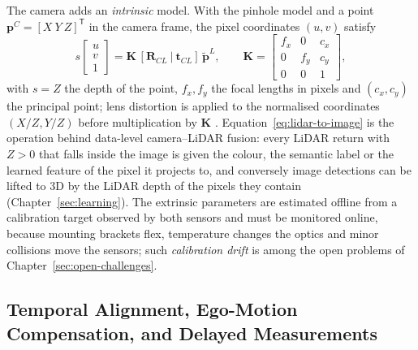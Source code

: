 The camera adds an \emph{intrinsic} model. With the pinhole model and a point $\mathbf{p}^{C}=[X\ Y\ Z]^{\mathsf T}$ in the camera frame, the pixel coordinates $(u,v)$ satisfy
\begin{equation}
s\begin{bmatrix}u\\ v\\ 1\end{bmatrix}
=\mathbf{K}\,[\mathbf{R}_{C\!L}\ |\ \mathbf{t}_{C\!L}]\,\tilde{\mathbf{p}}^{L},
\qquad
\mathbf{K}=
\begin{bmatrix}
f_{x} & 0 & c_{x}\\
0 & f_{y} & c_{y}\\
0 & 0 & 1
\end{bmatrix},
\label{eq:lidar-to-image}
\end{equation}
with $s=Z$ the depth of the point, $f_{x},f_{y}$ the focal lengths in pixels and $(c_{x},c_{y})$ the principal point; lens distortion is applied to the normalised coordinates $(X/Z,Y/Z)$ before multiplication by $\mathbf{K}$ \cite{zhang2000_calibration}. Equation~\eqref{eq:lidar-to-image} is the operation behind data-level camera--LiDAR fusion: every LiDAR return with $Z>0$ that falls inside the image is given the colour, the semantic label or the learned feature of the pixel it projects to, and conversely image detections can be lifted to 3D by the LiDAR depth of the pixels they contain (Chapter~\ref{sec:learning}). The extrinsic parameters are estimated offline from a calibration target observed by both sensors \cite{geiger2012_calibration} and must be monitored online, because mounting brackets flex, temperature changes the optics and minor collisions move the sensors; such \emph{calibration drift} is among the open problems of Chapter~\ref{sec:open-challenges}.

\subsection{Temporal Alignment, Ego-Motion Compensation, and Delayed Measurements}
\label{subsec:temporal-alignment}

